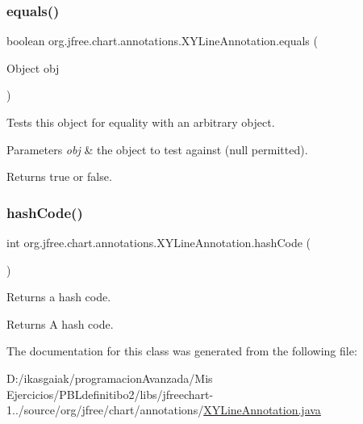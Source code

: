 \subsubsection{\texorpdfstring{equals()}{equals()}}
{\footnotesize\ttfamily boolean org.\+jfree.\+chart.\+annotations.\+X\+Y\+Line\+Annotation.\+equals (\begin{DoxyParamCaption}\item[{Object}]{obj }\end{DoxyParamCaption})}

Tests this object for equality with an arbitrary object.


\begin{DoxyParams}{Parameters}
{\em obj} & the object to test against ({\ttfamily null} permitted).\\
\hline
\end{DoxyParams}
\begin{DoxyReturn}{Returns}
{\ttfamily true} or {\ttfamily false}. 
\end{DoxyReturn}
\mbox{\label{classorg_1_1jfree_1_1chart_1_1annotations_1_1_x_y_line_annotation_a0118ebaa2050bc41a505c86a2a4e2bfa}} 
\subsubsection{\texorpdfstring{hash\+Code()}{hashCode()}}
{\footnotesize\ttfamily int org.\+jfree.\+chart.\+annotations.\+X\+Y\+Line\+Annotation.\+hash\+Code (\begin{DoxyParamCaption}{ }\end{DoxyParamCaption})}

Returns a hash code.

\begin{DoxyReturn}{Returns}
A hash code. 
\end{DoxyReturn}


The documentation for this class was generated from the following file\+:\begin{DoxyCompactItemize}
\item 
D\+:/ikasgaiak/programacion\+Avanzada/\+Mis Ejercicios/\+P\+B\+Ldefinitibo2/libs/jfreechart-\/1../source/org/jfree/chart/annotations/\mbox{\hyperlink{_x_y_line_annotation_8java}{X\+Y\+Line\+Annotation.\+java}}\end{DoxyCompactItemize}
